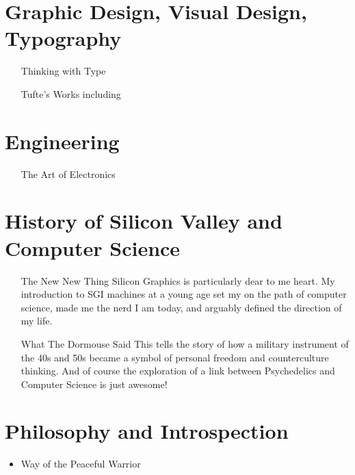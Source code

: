 \section{Graphic Design, Visual Design, Typography}

\begin{itemize}

\item[Thinking with Type]

\item[Tufte's Works] including 

\end{itemize}

\section{Engineering}

\begin{itemize}

\item[The Art of Electronics]

\end{itemize}

\section{History of Silicon Valley and Computer Science}

\begin{itemize}

\item[The New New Thing] Silicon Graphics is particularly dear to me heart. My introduction to SGI machines at a young age set my on the path of computer science, made me the nerd I am today, and arguably defined the direction of my life.

\item[What The Dormouse Said] This tells the story of how a military instrument of the 40s and 50s became a symbol of personal freedom and counterculture thinking. And of course the exploration of a link between Psychedelics and Computer Science is just awesome!

\end{itemize}

\section{Philosophy and Introspection}

\begin{itemize}

\item Way of the Peaceful Warrior

\end{itemize}
